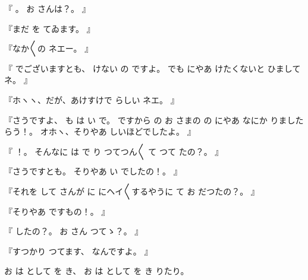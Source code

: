 『
。
お
さんは？。
』

『まだ
を
てゐます。
』

『なか〳〵の
ネエー。
』

『
でございますとも、
けない
の
ですよ。
でも
にやあ
けたくないと
ひましてネ。
』

『ホヽヽ、だが、あけすけで
らしい
ネエ。
』

『さうですよ、
も
は
い
で。
ですから
の
お
さまの
の
にやあ
なにか
りましたらう！。
オホヽ、そりやあ
しいほどでしたよ。
』

『
！。
そんなに
は
で
り
つてつん〳〵
て
つて
たの？。
』

『さうですとも。
そりやあ
い
でしたの！。
』

『それを
して
さんが
に
にヘイ〳〵するやうに
て
お
だつたの？。
』

『そりやあ
ですもの！。
』

『
したの？。
お
さん
つてゝ？。
』

『すつかり
つてます、
なんですよ。
』

お
は
として
を
き、
お
は
として
を
き
りたり。

